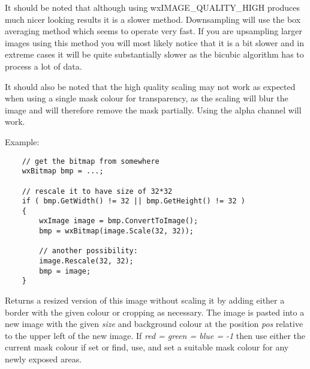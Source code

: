 It should be noted that although using wxIMAGE\_QUALITY\_HIGH produces much nicer
looking results it is a slower method.  Downsampling will use the box averaging method
which seems to operate very fast.  If you are upsampling larger images using
this method you will most likely notice that it is a bit slower and in extreme cases
it will be quite substantially slower as the bicubic algorithm has to process a lot of
data.

It should also be noted that the high quality scaling may not work as expected
when using a single mask colour for transparency, as the scaling will blur the
image and will therefore remove the mask partially. Using the alpha channel
will work.

Example:

\begin{verbatim}
    // get the bitmap from somewhere
    wxBitmap bmp = ...;

    // rescale it to have size of 32*32
    if ( bmp.GetWidth() != 32 || bmp.GetHeight() != 32 )
    {
        wxImage image = bmp.ConvertToImage();
        bmp = wxBitmap(image.Scale(32, 32));

        // another possibility:
        image.Rescale(32, 32);
        bmp = image;
    }

\end{verbatim}




\label{wximagesize}


Returns a resized version of this image without scaling it by adding either a border
with the given colour or cropping as necessary. The image is pasted into a new
image with the given {\it size} and background colour at the position {\it pos}
relative to the upper left of the new image. If {\it red = green = blue = -1}
then use either the current mask colour if set or find, use, and set a
suitable mask colour for any newly exposed areas.




\label{wximagesetalpha}


